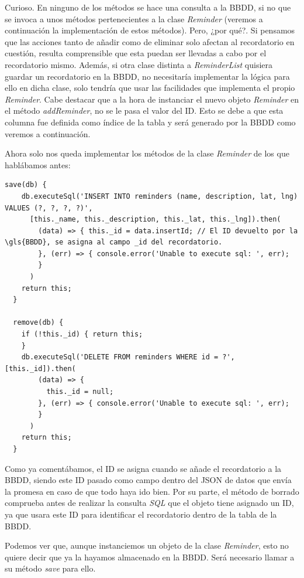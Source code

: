 Curioso. En ninguno de los métodos se hace una consulta a la \gls{BBDD}, si no que se invoca a unos métodos pertenecientes a la clase \emph{Reminder} (veremos a continuación la implementación de estos métodos). Pero, ¿por qué?. Si pensamos que las acciones tanto de añadir como de eliminar solo afectan al recordatorio en cuestión, resulta comprensible que esta puedan ser llevadas a cabo por el recordatorio mismo. Además, si otra clase distinta a \emph{ReminderList} quisiera guardar un recordatorio en la BBDD, no necesitaría implementar la lógica para ello en dicha clase, solo tendría que usar las facilidades que implementa el propio \emph{Reminder}. Cabe destacar que a la hora de instanciar el nuevo objeto \emph{Reminder} en el método \emph{addReminder}, no se le pasa el valor del ID. Esto se debe a que esta columna fue definida como índice de la tabla y será generado por la \gls{BBDD} como veremos a continuación.

Ahora solo nos queda implementar los métodos de la clase \emph{Reminder} de los que hablábamos antes:

\begin{lstlisting}[style=htmlcssjs,frame=tlrb,xleftmargin={0.2cm}]
  save(db) {
    db.executeSql('INSERT INTO reminders (name, description, lat, lng) VALUES (?, ?, ?, ?)',
      [this._name, this._description, this._lat, this._lng]).then(
        (data) => { this._id = data.insertId; // El ID devuelto por la \gls{BBDD}, se asigna al campo _id del recordatorio.
        }, (err) => { console.error('Unable to execute sql: ', err);
        }
      )
    return this;
  }

  remove(db) {
    if (!this._id) { return this;
    }
    db.executeSql('DELETE FROM reminders WHERE id = ?', [this._id]).then(
        (data) => {
          this._id = null;
        }, (err) => { console.error('Unable to execute sql: ', err);
        }
      )
    return this;
  }
\end{lstlisting}

Como ya comentábamos, el ID se asigna cuando se añade el recordatorio a la \gls{BBDD}, siendo este ID pasado como campo dentro del \gls{JSON} de datos que envía la promesa en caso de que todo haya ido bien. Por su parte, el método de borrado comprueba antes de realizar la consulta \emph{SQL} que el objeto tiene asignado un ID, ya que usara este ID para identificar el recordatorio dentro de la tabla de la \gls{BBDD}.

Podemos ver que, aunque instanciemos un objeto de la clase \emph{Reminder}, esto no quiere decir que ya la hayamos almacenado en la \gls{BBDD}. Será necesario llamar a su método \emph{save} para ello.


